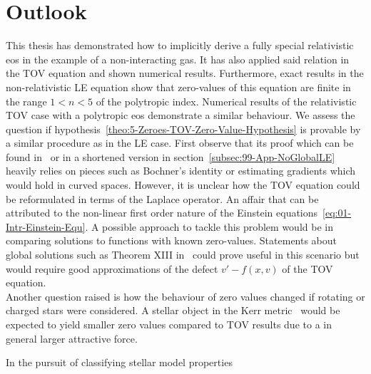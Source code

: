 \section{Outlook}
\label{sec:80-Outlook}
This thesis has demonstrated how to implicitly derive a fully special relativistic \ac{eos} in the example of a non-interacting gas.
It has also applied said relation in the \ac{TOV} equation and shown numerical results.
Furthermore, exact results in the non-relativistic \ac{LE} equation show that zero-values of this equation are finite in the range $1<n<5$ of the polytropic index.
Numerical results of the relativistic \ac{TOV} case with a polytropic \ac{eos} demonstrate a similar behaviour.
We assess the question if hypothesis~\ref{theo:5-Zeroes-TOV-Zero-Value-Hypothesis} is provable by a similar procedure as in the \ac{LE} case.
First observe that its proof which can be found in~\cite{quittnerSuperlinearParabolicProblems2007} or in a shortened version in section~\ref{subsec:99-App-NoGlobalLE} heavily relies on pieces such as Bochner's identity or estimating gradients which would hold in curved spaces.
However, it is unclear how the \ac{TOV} equation could be reformulated in terms of the Laplace operator.
An affair that can be attributed to the non-linear first order nature of the Einstein equations~\ref{eq:01-Intr-Einstein-Equ}.
A possible approach to tackle this problem would be in comparing solutions to functions with known zero-values.
Statements about global solutions such as Theorem XIII in~\cite[p. 99]{walterOrdinaryDifferentialEquations1998} could prove useful in this scenario but would require good approximations of the defect $v'-f(x,v)$ of the \ac{TOV} equation.\\
Another question raised is how the behaviour of zero values changed if rotating or charged stars were considered.
A stellar object in the Kerr metric~\cite{kerrGravitationalFieldSpinning1963} would be expected to yield smaller zero values compared to \ac{TOV} results due to a in general larger attractive force.



In the pursuit of classifying stellar model properties
